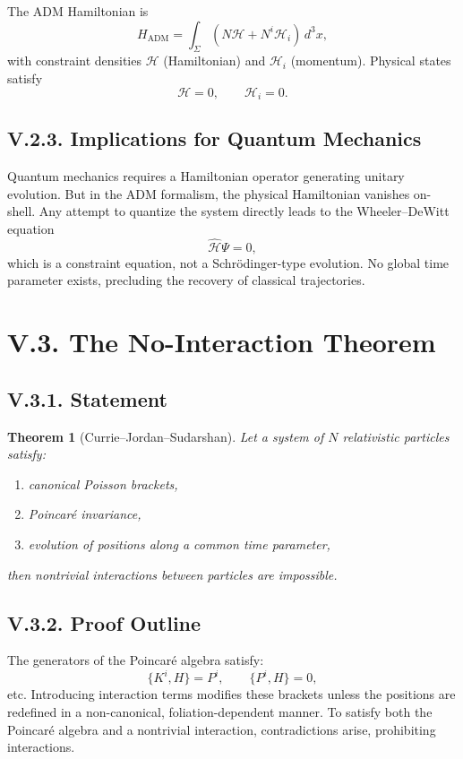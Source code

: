 \documentclass[12pt,oneside]{book}
\theoremstyle{plain}
\newtheorem{theorem}{Theorem}[chapter]
\theoremstyle{definition}
\begin{document}
The ADM Hamiltonian is
\[
H_{\mathrm{ADM}} = \int_\Sigma (N \mathcal{H} + N^i \mathcal{H}_i) \, d^3x,
\]
with constraint densities $\mathcal{H}$ (Hamiltonian) and $\mathcal{H}_i$ (momentum). Physical states satisfy
\[
\mathcal{H} = 0, \qquad \mathcal{H}_i = 0.
\]

\subsection*{V.2.3. Implications for Quantum Mechanics}

Quantum mechanics requires a Hamiltonian operator generating unitary evolution. But in the ADM formalism, the physical Hamiltonian vanishes on-shell. Any attempt to quantize the system directly leads to the Wheeler–DeWitt equation
\[
\widehat{\mathcal{H}} \Psi = 0,
\]
which is a constraint equation, not a Schrödinger-type evolution. No global time parameter exists, precluding the recovery of classical trajectories.

\section{V.3. The No-Interaction Theorem}

\subsection*{V.3.1. Statement}

\begin{theorem}[Currie–Jordan–Sudarshan]
Let a system of $N$ relativistic particles satisfy:

\begin{enumerate}
    \item canonical Poisson brackets,
    \item Poincaré invariance,
    \item evolution of positions along a common time parameter,
\end{enumerate}

then nontrivial interactions between particles are impossible.
\end{theorem}

\subsection*{V.3.2. Proof Outline}

The generators of the Poincaré algebra satisfy:
\[
\{K^i,H\} = P^i, \qquad \{P^i,H\}=0,
\]
etc. Introducing interaction terms modifies these brackets unless the positions are redefined in a non-canonical, foliation-dependent manner. To satisfy both the Poincaré algebra and a nontrivial interaction, contradictions arise, prohibiting interactions.
\end{document}
